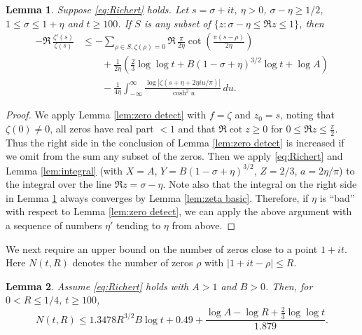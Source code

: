 \documentclass[10pt]{amsart}
\theoremstyle{remark}
\theoremstyle{plain}
\newtheorem{lemma}{Lemma}[section]
\numberwithin{equation}{section}
\theoremstyle{definition}
\def\({\left(}
\def\){\right)}
\def\pfrac#1#2{\left(\frac{#1}{#2}\right)}
\def\sg{\sigma}
\begin{document}
\begin{lemma}\label{lem:real zeta}
Suppose \eqref{eq:Richert} holds.
Let $s = \sigma+it$, $\eta>0$, $\sg - \eta \ge 1/2$,  $1\le \sigma \le 1+\eta$
and $t \ge 100$. If $S$ is any subset of $\{ z : \sigma-\eta \le \Re
z \le 1 \}$, then
\begin{align*}
- \Re \, \frac{\zeta'(s)}{\zeta(s)} &\le -  \sum_{\rho \in S, \zeta(\rho)=0} 
\Re \, \frac{\pi}{2\eta}  \cot\pfrac{\pi (s-\rho)}{2\eta} \\
&\qquad +\frac{1}{2\eta} \( \frac23 \log\log t +
  B (1-\sg+\eta)^{3/2} \log t +\log A\) \\ 
&\qquad  - \frac{1}{4\eta} \int_{-\infty}^\infty
  \frac{\log |\zeta(s+\eta+2\eta i u /\pi)|}{\cosh^2 u}\, du.
\end{align*}
\end{lemma}

\begin{proof}  We apply Lemma \ref{lem:zero detect}
 with $f=\zeta$ and $z_0=s$, noting that
$\zeta(0)\ne 0$, all
zeros have real part $<1$ and that $\Re \cot z \ge 0$ for $0 \le \Re z \le
\tfrac{\pi}2$.  Thus the right side in the conclusion of Lemma 
\ref{lem:zero detect} is increased
if we omit from the sum any subset of the zeros. 
Then we apply \eqref{eq:Richert} and Lemma \ref{lem:integral} (with
$X=A$, $Y=B(1-\sigma+\eta)^{3/2}$, $Z=2/3$, $a=2\eta/\pi$) to the integral 
over the line $\Re z = \sigma-\eta$.
Note also that the integral on the right side in Lemma \ref{lem:real zeta}
always converges by Lemma \ref{lem:zeta basic}.
Therefore, if $\eta$ is ``bad'' with respect to Lemma \ref{lem:zero detect},
we can apply the above argument
with a sequence of numbers $\eta'$ tending to $\eta$ from above. 
\end{proof}

We next require an upper bound on the number of zeros close to a point
$1+it$.  Here $N(t,R)$ denotes the number of zeros $\rho$ with
$|1+it-\rho|\le R$.

%
%

\begin{lemma}\label{lem:N(t,R)}
Assume \eqref{eq:Richert} holds with $A>1$ and $B>0$.
Then, for $0<R\le 1/4$, $t\ge 100$,
$$
N(t,R) \le 1.3478 R^{3/2} B\log t  + 0.49 + \frac{\log A
-\log R+\tfrac23 \log\log t}{1.879}.
$$
\end{lemma}
\end{document}

